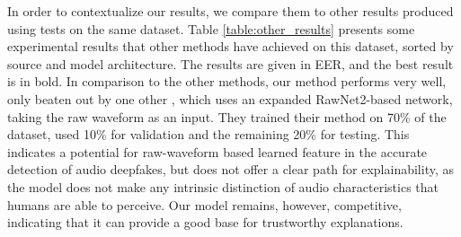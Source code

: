 \documentclass{article}
\begin{document}
			In order to contextualize our results, we compare them to other results produced using
			tests on the same dataset. Table \ref{table:other_results} presents some experimental
			results that other methods have achieved on this dataset, sorted by source and model
			architecture. The results are given in EER, and the best result is in bold. In
			comparison to the other methods, our method performs very well, only beaten out by one
			other \cite{ranjan_statnet_2022}, which uses an expanded RawNet2-based network, taking
			the raw waveform as an input. They trained their method on 70\% of the dataset, used
			10\% for validation and the remaining 20\% for testing. This indicates a potential for
			raw-waveform based learned feature in the accurate detection of audio deepfakes, but
			does not offer a clear path for explainability, as the model does not make any
			intrinsic distinction of audio characteristics that humans are able to perceive. Our
			model remains, however, competitive, indicating that it can provide a good base for
			trustworthy explanations.
\end{document}
